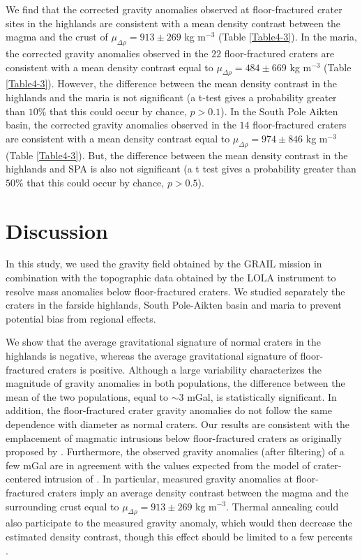 We   find   that  the   corrected   gravity   anomalies  observed   at
floor-fractured crater  sites in the  highlands are consistent  with a
mean   density  contrast   between  the   magma  and   the  crust   of
$\mu_{\Delta \rho} = 913 \pm 269 $ kg m$^{-3}$ (Table \ref{Table4-3}).
In the  maria, the  corrected gravity anomalies  observed in  the $22$
floor-fractured craters  are consistent  with a mean  density contrast
equal  to  $\mu_{\Delta  \rho}  =  484 \pm  669$  kg  m$^{-3}$  (Table
\ref{Table4-3}).   However, the  difference between  the mean  density
contrast in the  highlands and the maria is not  significant (a t-test
gives  a probability  greater than  $10\%$  that this  could occur  by
chance, $p  > 0.1$).  In  the South  Pole Aikten basin,  the corrected
gravity  anomalies observed  in the  $14$ floor-fractured  craters are
consistent    with    a    mean     density    contrast    equal    to
$\mu_{\Delta \rho} = 974 \pm 846 $ kg m$^{-3}$ (Table \ref{Table4-3}).
But, the difference between the mean density contrast in the highlands
and SPA is also not significant  (a t test gives a probability greater
than $50\%$ that this could occur by chance, $p > 0.5$).

\section{Discussion}
\label{C6-sec:discussion}

In  this study,  we  used  the gravity  field  obtained  by the  GRAIL
mission in combination with the topographic data obtained by the LOLA
instrument to  resolve mass anomalies below  floor-fractured craters.
We  studied separately  the craters  in the  farside highlands,  South
Pole-Aikten basin  and maria to  prevent potential bias  from regional
effects.

We show that the average  gravitational signature of normal craters in
the highlands is negative, whereas the average gravitational signature
of floor-fractured craters is  positive.  Although a large variability
characterizes the magnitude of  gravity anomalies in both populations,
the  difference between  the mean  of  the two  populations, equal  to
$\sim  3$  mGal,  is  statistically  significant.   In  addition,  the
floor-fractured  crater  gravity  anomalies  do not  follow  the  same
dependence  with   diameter  as  normal  craters.    Our  results  are
consistent  with   the  emplacement   of  magmatic   intrusions  below
floor-fractured     craters     as      originally     proposed     by
\citet{Schultz:1976kt}.  Furthermore,  the observed  gravity anomalies
(after  filtering) of  a few  mGal are  in agreement  with the  values
expected   from   the   model    of   crater-centered   intrusion   of
\citet{Thorey:2014cv}.  In  particular, measured gravity  anomalies at
floor-fractured craters imply an  average density contrast between the
magma      and      the      surrounding      crust      equal      to
$\mu_{\Delta \rho} = 913 \pm 269$ kg m$^{-3}$. Thermal annealing could
also participate  to the  measured gravity  anomaly, which  would then
decrease the estimated density contrast,  though this effect should be
limited to a few percents \citep{Michaut:2011dt,Kiefer:2013hr}.

